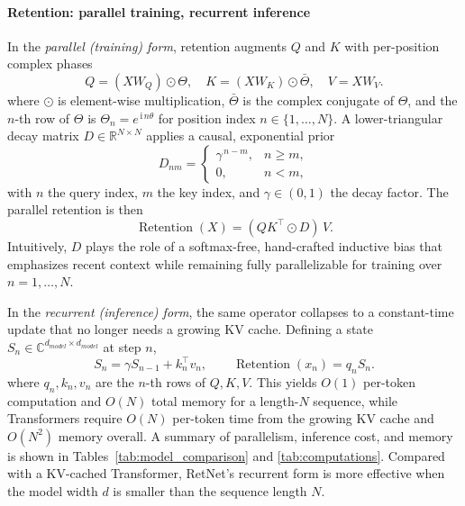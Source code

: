 \documentclass[times, review, 10pt]{elsarticle}
\begin{document}
\paragraph{Retention: parallel training, recurrent inference}
In the \emph{parallel (training) form}, retention augments $Q$ and $K$ with per-position complex phases
\begin{equation}
Q=(XW_Q)\odot\Theta,\quad
K=(XW_K)\odot\bar{\Theta},\quad
V=XW_V.
\label{eq:qkv-theta}
\end{equation}
where $\odot$ is element-wise multiplication, $\bar{\Theta}$ is the complex conjugate of $\Theta$, and the $n$-th row of $\Theta$ is $\Theta_n=e^{\,\mathrm{i}\,n\theta}$ for position index $n\in\{1,\dots,N\}$.
A lower-triangular decay matrix $D\in\mathbb{R}^{N\times N}$ applies a causal, exponential prior
\begin{equation}
D_{nm}=\begin{cases}
\gamma^{\,n-m}, & n \ge m,\\[2pt]
0, & n < m,
\end{cases}
\label{eq:retention-D}
\end{equation}
with $n$ the query index, $m$ the key index, and $\gamma\in(0,1)$ the decay factor. The parallel retention is then
\begin{equation}
\operatorname{Retention}(X) = (QK^\top \odot D)\,V.
\label{eq:retention-matrix}
\end{equation}
Intuitively, $D$ plays the role of a softmax-free, hand-crafted inductive bias that emphasizes recent context while remaining fully parallelizable for training over $n=1,\ldots, N$.

In the \emph{recurrent (inference) form}, the same operator collapses to a constant-time update that no longer needs a growing KV cache. Defining a state $S_n\in\mathbb{C}^{d_{model}\times d_{model}}$ at step $n$,
\begin{equation}
S_n = \gamma S_{n-1} + k_n^\top v_n, \qquad 
\operatorname{Retention}(x_n) = q_n S_n.
\label{eq:retention-recursion}
\end{equation}
where $q_n,k_n,v_n$ are the $n$-th rows of $Q,K,V$.   This yields $O(1)$ per-token computation and $O(N)$ total memory for a length-$N$ sequence, while Transformers require $O(N)$ per-token time from the growing KV cache and $O(N^2)$ memory overall. A summary of parallelism, inference cost, and memory is shown in Tables~\ref{tab:model_comparison} and \ref{tab:computations}. Compared with a KV-cached Transformer, RetNet’s recurrent form is more effective when the model width $d$ is smaller than the sequence length $N$. 
\end{document}

